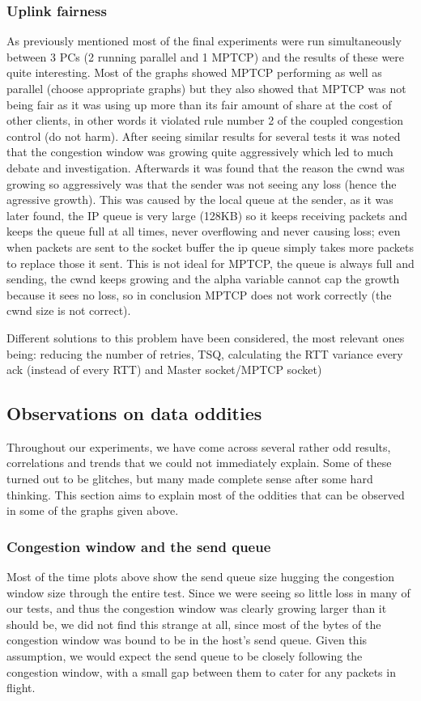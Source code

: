\documentclass[12pt,a4paper]{article}
\begin{document}
\subsubsection{Uplink fairness}
As previously mentioned most of the final experiments were run simultaneously
between 3 PCs (2 running parallel and 1 MPTCP) and the results of these were
quite interesting. Most of the graphs showed MPTCP performing as well as
parallel (choose appropriate graphs) but they also showed that MPTCP was not
being fair as it was using up more than its fair amount of share at the cost of
other clients, in other words it violated rule number 2 of the coupled
congestion control (do not harm). After seeing similar results for several tests
it was noted that the congestion window was growing quite aggressively which led
to much debate and investigation. Afterwards it was found that the reason the
cwnd was growing so aggressively was that the sender was not seeing any loss
(hence the agressive growth). This was caused by the local queue at the sender,
as it was later found, the IP queue is very large (128KB) so it keeps receiving
packets and keeps the queue full at all times, never overflowing and never
causing loss; even when packets are sent to the socket buffer the ip queue
simply takes more packets to replace those it sent. This is not ideal for MPTCP,
the queue is always full and sending, the cwnd keeps growing and the alpha
variable cannot cap the growth because it sees no loss, so in conclusion MPTCP
does not work correctly (the cwnd size is not correct).

Different solutions to this problem have been considered, the most relevant ones
being: reducing the number of retries, TSQ, calculating the RTT variance every
ack (instead of every RTT) and Master socket/MPTCP socket)

\subsection{Observations on data oddities}
Throughout our experiments, we have come across several rather odd results,
correlations and trends that we could not immediately explain. Some of these
turned out to be glitches, but many made complete sense after some hard
thinking. This section aims to explain most of the oddities that can be observed
in some of the graphs given above.

\subsubsection{Congestion window and the send queue}
Most of the time plots above show the send queue size hugging the congestion
window size through the entire test. Since we were seeing so little loss in many
of our tests, and thus the congestion window was clearly growing larger than it
should be, we did not find this strange at all, since most of the bytes
of the congestion window was bound to be in the host's send queue. Given this
assumption, we would expect the send queue to be closely following the
congestion window, with a small gap between them to cater for any packets in
flight.
\end{document}
